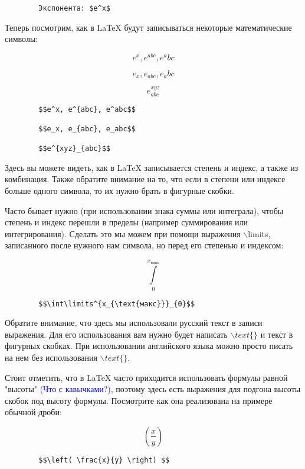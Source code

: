     \begin{verbatim}
        Экспонента: $e^x$
    \end{verbatim}
    
    Теперь посмотрим, как в \LaTeX{} будут записываться некоторые математические символы:
    
    $$e^x, e^{abc}, e^abc$$
        
    $$e_x, e_{abc}, e_abc$$
    
    $$e^{xyz}_{abc}$$
    
    \begin{verbatim}
        $$e^x, e^{abc}, e^abc$$
        
        $$e_x, e_{abc}, e_abc$$
        
        $$e^{xyz}_{abc}$$
    \end{verbatim} 
    
    Здесь вы можете видеть, как в \LaTeX{} записывается степень и индекс, а также из комбинация. Также обратите внимание на то, что если в степени или индексе больше одного символа, то их нужно брать в фигурные скобки.
    
    Часто бывает нужно (при использовании знака суммы или интеграла), чтобы степень и индекс перешли в пределы (например суммирования или интегрирования). Сделать это мы можем при помощи выражения $\backslash$limits, записанного после нужного нам символа, но перед его степенью и индексом:
    
    $$\int\limits^{x_{\text{макс}}}_{0}$$
    
    \begin{verbatim}
        $$\int\limits^{x_{\text{макс}}}_{0}$$
    \end{verbatim}
    
    Обратите внимание, что здесь мы использовали русский текст в записи выражения. Для его использования вам нужно будет написать $\backslash text\{\}$ и текст в фигурных скобках. При использовании английского языка можно просто писать на нем без использования $\backslash text\{\}$.
    
    Стоит отметить, что в \LaTeX{} часто приходится использовать формулы равной "высоты" \textcolor{Blue}{(Что с кавычками?)}, поэтому здесь есть выражения для подгона высоты скобок под высоту формулы. Посмотрите как она реализована на примере обычной дроби:
    
    $$\left( \frac{x}{y} \right) $$
    
    \begin{verbatim}
        $$\left( \frac{x}{y} \right) $$
    \end{verbatim}
    
